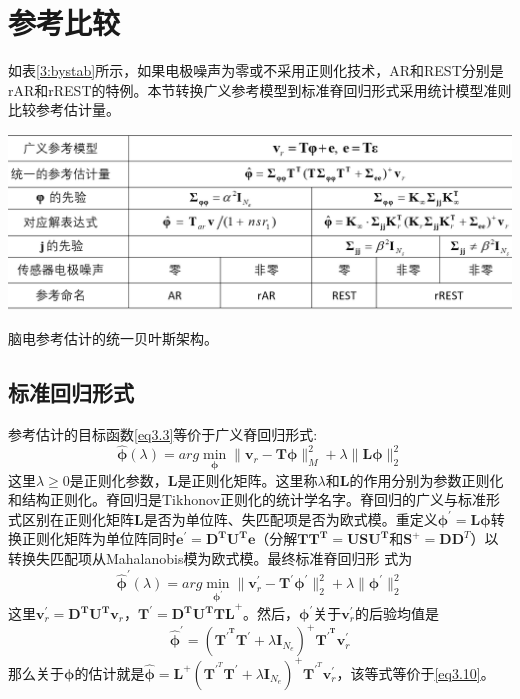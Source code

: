 \section{参考比较}
如表\ref{3:bystab}所示，如果电极噪声为零或不采用正则化技术，AR和REST分别是rAR和rREST的特例。本节转换广义参考模型到标准脊回归形式采用统计模型准则比较参考估计量。

\bigskip
\bigskip
\bigskip
\begin{table}[!h]
\includegraphics[width=\linewidth]{pic/Frontier/bayesiantab.png}
\caption{脑电参考估计的统一贝叶斯架构。}
\label{3:bystab}
\end{table}
\bigskip

\subsection{标准回归形式}
参考估计的目标函数\eqref{eq3.3}等价于广义脊回归形式:
\begin{equation}\label{eq3.11}
\hat{\mathbf{\phi}}(\lambda)=arg\min_{\mathbf{\phi}}{\lVert\mathbf{v}_{r}-\mathbf{T\phi}\rVert_{M}^{2}+\lambda\lVert\mathbf{L\phi}\rVert_2^2}
\end{equation}
这里$\lambda\geq{0}$是正则化参数，$\mathbf{L}$是正则化矩阵。这里称$\lambda$和$\mathbf{L}$的作用分别为参数正则化和结构正则化。脊回归是Tikhonov正则化的统计学名字。脊回归的广义与标准形式区别在正则化矩阵$\mathbf{L}$是否为单位阵、失匹配项是否为欧式模。重定义$\mathbf{\phi^\prime=L\phi}$转换正则化矩阵为单位阵同时$\mathbf{e^\prime=D^{T}U^{T}e}$（分解$\mathbf{TT^{T}=USU^{T}}$和$\mathbf{S}^+=\mathbf{DD}^T$）以转换失匹配项从Mahalanobis模为欧式模。最终标准脊回归形
式为
\begin{equation}\label{eq3.12}
\hat{\mathbf{\phi}}^\prime(\lambda)=arg\min_{\mathbf{\phi}^\prime}{\lVert{\mathbf{v}_r^\prime-\mathbf{T^\prime\phi^\prime}}\rVert_2^2+\lambda\lVert{\mathbf{\phi}^\prime}\rVert_2^2}
\end{equation}
这里$\mathbf{v}^\prime_r=\mathbf{D^TU^Tv}_r$，$\mathbf{T}^\prime=\mathbf{D^TU^TTL}^+$。然后，$\mathbf{\phi}^\prime$关于$\mathbf{v}^\prime_r$的后验均值是
\begin{equation}\label{eq3.13}
\hat{\mathbf{\phi}}^\prime=(\mathbf{T^{\prime^T}}\mathbf{T}^\prime+\lambda\mathbf{I}_{N_e})^+\mathbf{T^{\prime^T}}\mathbf{v}^\prime_r
\end{equation}
那么关于$\mathbf{\phi}$的估计就是$
\hat{\mathbf{\phi}}=\mathbf{L}^+(\mathbf{T}^{\prime^T}\mathbf{T}^\prime+\lambda\mathbf{I}_{N_e})^+\mathbf{T}^{\prime^T}\mathbf{v}^\prime_r$，该等式等价于\eqref{eq3.10}。

